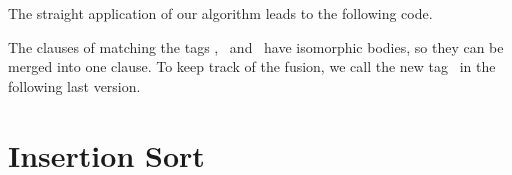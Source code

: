 The straight application of our algorithm leads to the following code.



\noindent The clauses of  matching the tags
, ~and~ have isomorphic bodies, so
they can be merged into one clause. To keep track of the fusion, we
call the new tag~ in the following last version.




\section*{Insertion Sort}
\label{ans:insertion_sort}


\medskip

